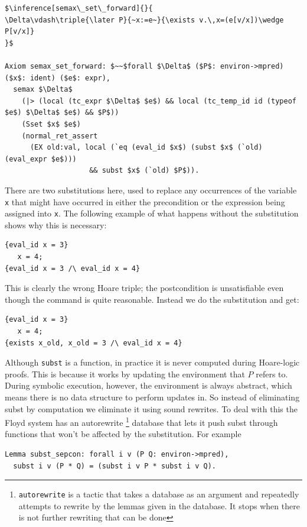 \documentclass{puthesis}
\begin{document}
\begin{lstlisting}
$\inference[semax\_set\_forward]{}{
\Delta\vdash\triple{\later P}{~x:=e~}{\exists v.\,x=(e[v/x])\wedge P[v/x]}
}$

Axiom semax_set_forward: $~~$forall $\Delta$ ($P$: environ->mpred) ($x$: ident) ($e$: expr),
  semax $\Delta$
    (|> (local (tc_expr $\Delta$ $e$) && local (tc_temp_id id (typeof $e$) $\Delta$ $e$) && $P$))
    (Sset $x$ $e$) 
    (normal_ret_assert 
      (EX old:val, local (`eq (eval_id $x$) (subst $x$ (`old) (eval_expr $e$)))
                    && subst $x$ (`old) $P$)).
\end{lstlisting}

There are two substitutions here, used to replace any occurrences of
the variable \lstinline|x| that might have occurred in either the
precondition or the expression being assigned into \lstinline|x|. The
following example of what happens without the substitution shows why
this is necessary:

\begin{lstlisting}
{eval_id x = 3}
   x = 4;
{eval_id x = 3 /\ eval_id x = 4}
\end{lstlisting}

This is clearly the wrong Hoare triple; the postcondition is
unsatisfiable even though the command is quite reasonable. Instead we
do the substitution and get:

\begin{lstlisting}
{eval_id x = 3}
   x = 4;
{exists x_old, x_old = 3 /\ eval_id x = 4}
\end{lstlisting}

Although \lstinline|subst| is a function, in practice it is never
computed during Hoare-logic proofs.  This is because it works by
updating the environment that $P$ refers to. During symbolic
execution, however, the environment is always abstract, which means
there is no data structure to perform updates in. So instead of
eliminating subst by computation we eliminate it using sound rewrites.
To deal with this the Floyd system has an autorewrite
\footnote{\lstinline|autorewrite| is a tactic
  that takes a database as an argument and repeatedly attempts to
  rewrite by the lemmas given in the database. It stops when there is
  not further rewriting that can be done}
database that lets it push subst through
functions that won't be affected by the substitution. For example

\begin{lstlisting}
Lemma subst_sepcon: forall i v (P Q: environ->mpred),
  subst i v (P * Q) = (subst i v P * subst i v Q).
\end{lstlisting}
\end{document}
